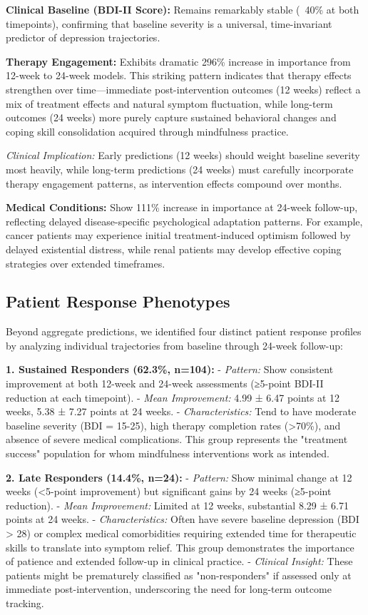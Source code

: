 \documentclass[conference]{IEEEtran}
\begin{document}
\textbf{Clinical Baseline (BDI-II Score):} Remains remarkably stable (~40\% at both timepoints), confirming that baseline severity is a universal, time-invariant predictor of depression trajectories.

\textbf{Therapy Engagement:} Exhibits dramatic 296\% increase in importance from 12-week to 24-week models. This striking pattern indicates that therapy effects strengthen over time—immediate post-intervention outcomes (12 weeks) reflect a mix of treatment effects and natural symptom fluctuation, while long-term outcomes (24 weeks) more purely capture sustained behavioral changes and coping skill consolidation acquired through mindfulness practice.

\textit{Clinical Implication:} Early predictions (12 weeks) should weight baseline severity most heavily, while long-term predictions (24 weeks) must carefully incorporate therapy engagement patterns, as intervention effects compound over months.

\textbf{Medical Conditions:} Show 111\% increase in importance at 24-week follow-up, reflecting delayed disease-specific psychological adaptation patterns. For example, cancer patients may experience initial treatment-induced optimism followed by delayed existential distress, while renal patients may develop effective coping strategies over extended timeframes.

\subsection{Patient Response Phenotypes}

Beyond aggregate predictions, we identified four distinct patient response profiles by analyzing individual trajectories from baseline through 24-week follow-up:

\textbf{1. Sustained Responders (62.3\%, n=104):}
- \textit{Pattern:} Show consistent improvement at both 12-week and 24-week assessments (≥5-point BDI-II reduction at each timepoint).
- \textit{Mean Improvement:} 4.99 ± 6.47 points at 12 weeks, 5.38 ± 7.27 points at 24 weeks.
- \textit{Characteristics:} Tend to have moderate baseline severity (BDI = 15-25), high therapy completion rates (>70\%), and absence of severe medical complications. This group represents the "treatment success" population for whom mindfulness interventions work as intended.

\textbf{2. Late Responders (14.4\%, n=24):}
- \textit{Pattern:} Show minimal change at 12 weeks (<5-point improvement) but significant gains by 24 weeks (≥5-point reduction).
- \textit{Mean Improvement:} Limited at 12 weeks, substantial 8.29 ± 6.71 points at 24 weeks.
- \textit{Characteristics:} Often have severe baseline depression (BDI > 28) or complex medical comorbidities requiring extended time for therapeutic skills to translate into symptom relief. This group demonstrates the importance of patience and extended follow-up in clinical practice.
- \textit{Clinical Insight:} These patients might be prematurely classified as "non-responders" if assessed only at immediate post-intervention, underscoring the need for long-term outcome tracking.
\end{document}
